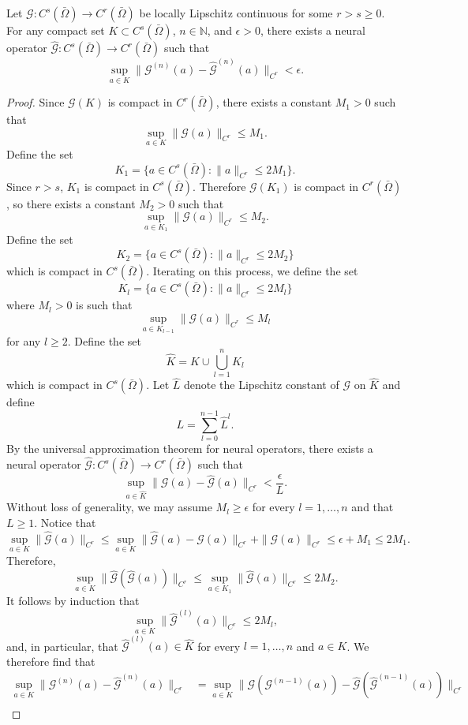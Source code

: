 \documentclass[10pt,a4paper]{amsart}
\newcommand{\G}{\mathcal{G}}
\newcommand{\N}{\mathbb{N}}
\begin{document}
\begin{lemma}
    \label{lemma:compose_r_greater_s}
    Let $\G: C^s (\bar{\Omega}) \to C^r (\bar{\Omega})$ be locally Lipschitz continuous for some $r > s \geq0$. For any compact set $K \subset C^s (\bar{\Omega})$, $n \in \N$, and $\epsilon > 0$, there exists a neural operator $\hat{\G} : C^s (\bar{\Omega}) \to C^r (\bar{\Omega})$ such that
    \[\sup_{a \in K} \|\G^{(n)}(a) - \hat{\G}^{(n)}(a) \|_{C^r} < \epsilon.\]
\end{lemma}

\begin{proof}
    Since $\G(K)$ is compact in $C^r (\bar{\Omega})$, there exists a constant $M_1 > 0$ such that
    \[\sup_{a \in K} \|\G(a)\|_{C^r} \leq M_1.\]
    Define the set
    \[K_1  = \{a \in C^s(\bar{\Omega}) : \|a\|_{C^r} \leq 2M_1\}.\]
    Since $r > s$, $K_1$ is compact in $C^s(\bar{\Omega})$. Therefore $\G(K_1)$ is compact in $C^r (\bar{\Omega})$, so there exists a constant $M_2 > 0$ such that 
    \[\sup_{a \in K_1} \|\G(a)\|_{C^r} \leq M_2.\]
    Define the set 
    \[K_2 = \{a \in C^s(\bar{\Omega}) : \|a\|_{C^r} \leq 2 M_2\}\]
    which is compact in $C^s (\bar{\Omega})$. Iterating on this process, we define the set
    \[K_l = \{a \in C^s (\bar{\Omega}) : \|a\|_{C^r} \leq 2 M_l\}\] where $M_l > 0$ is such that
    \[\sup_{a \in K_{l-1}} \|\G(a)\|_{C^r} \leq M_l\]
    for any $l \geq 2.$ Define the set 
    \[\hat{K} = K \cup \bigcup_{l=1}^n K_l\]
    which is compact in $C^s (\bar{\Omega})$. Let $\hat{L}$ denote the Lipschitz constant of $\G$ on $\hat{K}$
    and define
    \[L = \sum_{l=0}^{n-1} \hat{L}^l.\]
    By the universal approximation theorem for neural operators, there exists a neural operator $\hat{\G} : C^s (\bar{\Omega}) \to C^r (\bar{\Omega})$
    such that 
    \[\sup_{a \in \hat{K}} \|\G(a) - \hat{\G}(a) \|_{C^r} < \frac{\epsilon}{L}.\]
    Without loss of generality, we may assume $M_l \geq \epsilon$ for every $l = 1,\dots,n$ and that $L \geq 1$. Notice that
    \[\sup_{a \in K} \|\hat{\G}(a)\|_{C^r} \leq \sup_{a \in K} \|\hat{\G}(a) - \G(a)\|_{C^r} + \|\G(a)\|_{C^r} \leq \epsilon + M_1 \leq 2M_1.\]
    Therefore,
    \[\sup_{a \in K} \|\hat{\G}(\hat{\G}(a))\|_{C^r} \leq \sup_{a \in K_1} \|\hat{\G}(a)\|_{C^r} \leq 2 M_2.\]
    It follows by induction that
    \[\sup_{a \in K} \|\hat{\G}^{(l)}(a)\|_{C^r} \leq 2 M_l,\]
    and, in particular, that $\hat{\G}^{(l)}(a) \in \hat{K}$ for every $l=1,\dots,n$ and $a \in K$.
    We therefore find that
    \begin{align*}
        \sup_{a \in K} \|\G^{(n)}(a) - \hat{\G}^{(n)}(a)\|_{C^r} &= \sup_{a \in K} \|\G (\G^{(n-1)}(a)) - \hat{\G}(\hat{\G}^{(n-1)}(a)) \|_{C^r} \\

\end{align*}
\end{proof}
\end{document}
